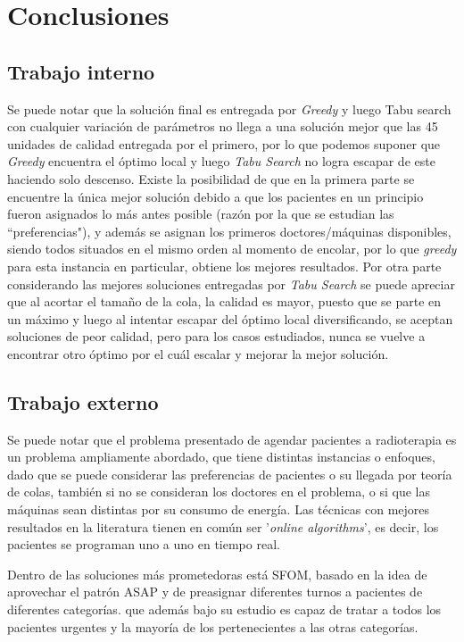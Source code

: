 \documentclass[letter, 10pt]{article}
\begin{document}
\section{Conclusiones}
\subsection{Trabajo interno}
    Se puede notar que la solución final es entregada por \textit{Greedy} y luego Tabu search con cualquier variación de parámetros no llega a una solución mejor que las 45 unidades de calidad entregada por el primero, por lo que podemos suponer que \textit{Greedy} encuentra el óptimo local y luego \textit{Tabu Search} no logra escapar de este haciendo solo descenso. Existe la posibilidad de que en la primera parte se encuentre la única mejor solución debido a que los pacientes en un principio fueron asignados lo más antes posible (razón por la que se estudian las ``preferencias"), y además se asignan los primeros doctores/máquinas disponibles, siendo todos situados en el mismo orden al momento de encolar, por lo que \textit{greedy} para esta instancia en particular, obtiene los mejores resultados.
    Por otra parte considerando las mejores soluciones entregadas por \textit{Tabu Search} se puede apreciar que al acortar el tamaño de la cola, la calidad es mayor, puesto que se parte en un máximo y luego al intentar escapar del óptimo local diversificando, se aceptan soluciones de peor calidad, pero para los casos estudiados, nunca se vuelve a encontrar otro óptimo por el cuál escalar y mejorar la mejor solución.
\subsection{Trabajo externo}
Se puede notar que el problema presentado de agendar pacientes a radioterapia es un problema ampliamente abordado, que tiene distintas instancias o enfoques, dado que se puede considerar las preferencias de pacientes o su llegada por teoría de colas\cite{cartoce}, también si no se consideran los doctores en el problema, o si que las máquinas sean distintas por su consumo de energía\cite{siete}. Las técnicas con mejores resultados en la literatura tienen en común ser '\textit{online algorithms}', es decir, los pacientes se programan uno a uno en tiempo real.

Dentro de las soluciones más prometedoras está SFOM, basado en la idea de aprovechar el patrón ASAP y de preasignar diferentes turnos a pacientes de diferentes categorías. que además bajo su estudio es capaz de tratar a todos los pacientes urgentes y la mayoría de los pertenecientes a las otras categorías.
\end{document}
